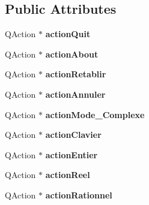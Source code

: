 \subsection*{Public Attributes}
\begin{DoxyCompactItemize}
\item 
\hypertarget{class_ui___main_window_a188c243f36a2dbc10e4e2a0ad94273b1}{Q\-Action $\ast$ {\bfseries action\-Quit}}\label{class_ui___main_window_a188c243f36a2dbc10e4e2a0ad94273b1}

\item 
\hypertarget{class_ui___main_window_abdf2b43167c2cd0d3405f90b8c30e934}{Q\-Action $\ast$ {\bfseries action\-About}}\label{class_ui___main_window_abdf2b43167c2cd0d3405f90b8c30e934}

\item 
\hypertarget{class_ui___main_window_a601a1ba9e9445f0ca1b26dfa67a78703}{Q\-Action $\ast$ {\bfseries action\-Retablir}}\label{class_ui___main_window_a601a1ba9e9445f0ca1b26dfa67a78703}

\item 
\hypertarget{class_ui___main_window_a664bb393ac59ffa411d7e9b3afff406f}{Q\-Action $\ast$ {\bfseries action\-Annuler}}\label{class_ui___main_window_a664bb393ac59ffa411d7e9b3afff406f}

\item 
\hypertarget{class_ui___main_window_a63f9fe57d2cb76fe2d4180a5ea63c554}{Q\-Action $\ast$ {\bfseries action\-Mode\-\_\-\-Complexe}}\label{class_ui___main_window_a63f9fe57d2cb76fe2d4180a5ea63c554}

\item 
\hypertarget{class_ui___main_window_ac69ed0b5ddad47458152a0ccea579e99}{Q\-Action $\ast$ {\bfseries action\-Clavier}}\label{class_ui___main_window_ac69ed0b5ddad47458152a0ccea579e99}

\item 
\hypertarget{class_ui___main_window_ab043cd3ce5b589be82c36a391a448ed8}{Q\-Action $\ast$ {\bfseries action\-Entier}}\label{class_ui___main_window_ab043cd3ce5b589be82c36a391a448ed8}

\item 
\hypertarget{class_ui___main_window_ad0dc959d5365caf61a470875ac938c2b}{Q\-Action $\ast$ {\bfseries action\-Reel}}\label{class_ui___main_window_ad0dc959d5365caf61a470875ac938c2b}

\item 
\hypertarget{class_ui___main_window_a1a6107ceba6147d13f11b75b5128dc7d}{Q\-Action $\ast$ {\bfseries action\-Rationnel}}\label{class_ui___main_window_a1a6107ceba6147d13f11b75b5128dc7d}


\end{DoxyCompactItemize}
